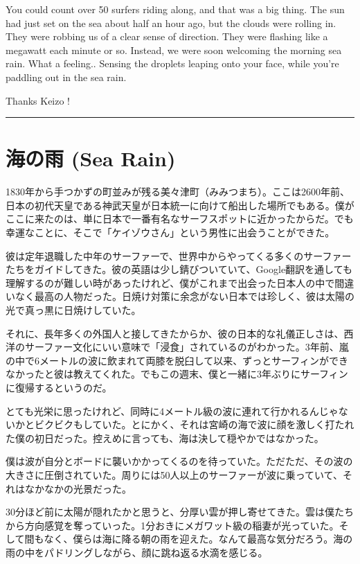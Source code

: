 \documentclass[
  letterpaper,
  oneside]{scrbook}
\begin{document}
You could count over 50 surfers riding along, and that was a big thing.
The sun had just set on the sea about half an hour ago, but the clouds
were rolling in. They were robbing us of a clear sense of direction.
They were flashing like a megawatt each minute or so. Instead, we were
soon welcoming the morning sea rain. What a feeling.. Sensing the
droplets leaping onto your face, while you're paddling out in the sea
rain.

Thanks Keizo !

\begin{center}\rule{0.5\linewidth}{0.5pt}\end{center}


\chapter{海の雨 (Sea Rain)}\label{ux6d77ux306eux96e8-sea-rain}

1830年から手つかずの町並みが残る美々津町（みみつまち）。ここは2600年前、日本の初代天皇である神武天皇が日本統一に向けて船出した場所でもある。僕がここに来たのは、単に日本で一番有名なサーフスポットに近かったからだ。でも幸運なことに、そこで「ケイゾウさん」という男性に出会うことができた。

彼は定年退職した中年のサーファーで、世界中からやってくる多くのサーファーたちをガイドしてきた。彼の英語は少し錆びついていて、Google翻訳を通しても理解するのが難しい時があったけれど、僕がこれまで出会った日本人の中で間違いなく最高の人物だった。日焼け対策に余念がない日本では珍しく、彼は太陽の光で真っ黒に日焼けしていた。

それに、長年多くの外国人と接してきたからか、彼の日本的な礼儀正しさは、西洋のサーファー文化にいい意味で「浸食」されているのがわかった。3年前、嵐の中で6メートルの波に飲まれて両膝を脱臼して以来、ずっとサーフィンができなかったと彼は教えてくれた。でもこの週末、僕と一緒に3年ぶりにサーフィンに復帰するというのだ。

とても光栄に思ったけれど、同時に4メートル級の波に連れて行かれるんじゃないかとビクビクもしていた。とにかく、それは宮崎の海で波に顔を激しく打たれた僕の初日だった。控えめに言っても、海は決して穏やかではなかった。

僕は波が自分とボードに襲いかかってくるのを待っていた。ただただ、その波の大きさに圧倒されていた。周りには50人以上のサーファーが波に乗っていて、それはなかなかの光景だった。

30分ほど前に太陽が隠れたかと思うと、分厚い雲が押し寄せてきた。雲は僕たちから方向感覚を奪っていった。1分おきにメガワット級の稲妻が光っていた。そして間もなく、僕らは海に降る朝の雨を迎えた。なんて最高な気分だろう。海の雨の中をパドリングしながら、顔に跳ね返る水滴を感じる。
\end{document}
